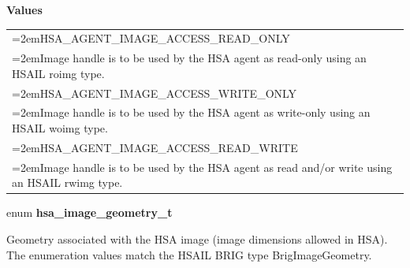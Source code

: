 \documentclass{book}
\newcommand{\hsadef}[2]{\hypertarget{#1}{\textbf{#2}}}
\begin{document}
\begin{appendices}
\noindent\textbf{Values}\\[-5mm]
\begin{longtable}{@{}>{\hangindent=2em}p{\linewidth}}
HSA\_AGENT\_IMAGE\_ACCESS\_READ\_ONLY \\\hspace{2em}Image handle is to be used by the HSA agent as read-only using an HSAIL roimg type.\\[2mm]
HSA\_AGENT\_IMAGE\_ACCESS\_WRITE\_ONLY \\\hspace{2em}Image handle is to be used by the HSA agent as write-only using an HSAIL woimg type.\\[2mm]
HSA\_AGENT\_IMAGE\_ACCESS\_READ\_WRITE \\\hspace{2em}Image handle is to be used by the HSA agent as read and/or write using an HSAIL rwimg type.
\end{longtable}

\noindent\begin{tcolorbox}[nobeforeafter,arc=0mm,colframe=white,colback=lightgray,left=0mm]
enum \hsadef{group__API__images_1ga31e40ddc0666f01a0821a9bc37ca514b}{hsa\_image\_geometry\_t}
\end{tcolorbox}
Geometry associated with the HSA image (image dimensions allowed in HSA). The enumeration values match the HSAIL BRIG type BrigImageGeometry.


\end{appendices}
\end{document}
